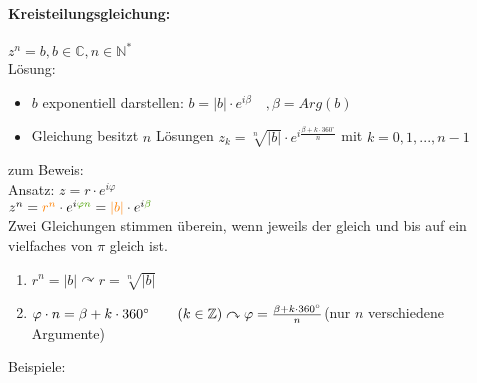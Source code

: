 \paragraph{Kreisteilungsgleichung:} \parskp
$\boxed{z^n=b}, b\in \mathbb{C}, n\in \mathbb{N}^*$\\
Lösung:
\begin{itemize}
\item $b$ exponentiell darstellen: $b=|b| \cdot e ^{i\beta} \quad , \beta = Arg(b)$
\item Gleichung besitzt $n$ Lösungen $\boxed{z_k=\sqrt[n]{|b|}\cdot e^{i\frac{\beta+k\cdot 360^{\circ}}{n}}}$ \qquad mit $k=0,1,...,n-1$
\end{itemize}
zum Beweis: \\
Ansatz: $z=r\cdot e^{i\varphi}$\\
$z^n=\torange{r^n}\cdot e^{i\tgreen{\varphi n}}=\torange{|b|} \cdot e^{i\tgreen{\beta}}$\\
Zwei Gleichungen stimmen überein, wenn jeweils der  gleich und  bis auf ein vielfaches von $\pi$ gleich ist.
\begin{enumerate}
\item $r^n=|b| \curvearrowright r = \sqrt[n]{|b|}$
\item $\varphi \cdot n = \beta + k \cdot 360^{\circ} \qquad (k \in \mathbb{Z})\\
\curvearrowright \varphi = \frac{\beta + k \cdot 360^{\circ}}{n}$\qquad (nur $n$ verschiedene Argumente)
\end{enumerate}
Beispiele:
